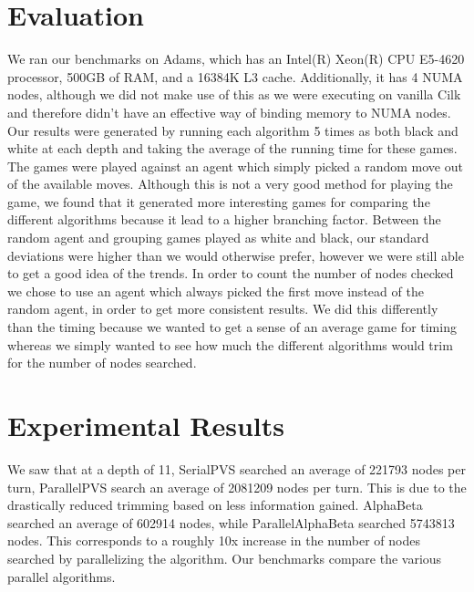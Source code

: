 \documentclass[]{article}
\begin{document}
\section{Evaluation}
We ran our benchmarks on Adams, which has an Intel(R) Xeon(R) CPU E5-4620 processor, 500GB of RAM, and a 16384K L3 cache.  Additionally, it has 4 NUMA nodes, although we did not make use of this as we were executing on vanilla Cilk and therefore didn't have an effective way of binding memory to NUMA nodes.  Our results were generated by running each algorithm 5 times as both black and white at each depth and taking the average of the running time for these games.  The games were played against an agent which simply picked a random move out of the available moves.  Although this is not a very good method for playing the game, we found that it generated more interesting games for comparing the different algorithms because it lead to a higher branching factor.  Between the random agent and grouping games played as white and black, our standard deviations were higher than we would otherwise prefer, however we were still able to get a good idea of the trends.  In order to count the number of nodes checked we chose to use an agent which always picked the first move instead of the random agent, in order to get more consistent results.  We did this differently than the timing because we wanted to get a sense of an average game for timing whereas we simply wanted to see how much the different algorithms would trim for the number of nodes searched.

\section*{Experimental Results}
We saw that at a depth of 11, SerialPVS searched an average of 221793 nodes per turn, ParallelPVS search an average of 2081209 nodes per turn.  This is due to the drastically reduced trimming based on less information gained.  AlphaBeta searched an average of 602914 nodes, while ParallelAlphaBeta searched 5743813 nodes.  This corresponds to a roughly 10x increase in the number of nodes searched by parallelizing the algorithm.  Our benchmarks compare the various parallel algorithms.
\end{document}
